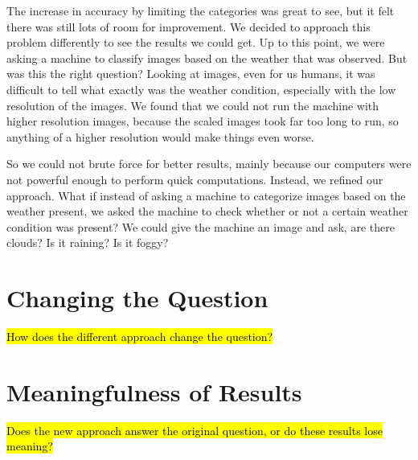 The increase in accuracy by limiting the categories was great to see, but it felt there was still lots of room for improvement. We decided to approach this problem differently to see the results we could get. Up to this point, we were asking a machine to classify images based on the weather that was observed. But was this the right question? Looking at images, even for us humans, it was difficult to tell what exactly was the weather condition, especially with the low resolution of the images. We found that we could not run the machine with higher resolution images, because the scaled images took far too long to run, so anything of a higher resolution would make things even worse.

So we could not brute force for better results, mainly because our computers were not powerful enough to perform quick computations. Instead, we refined our approach. What if instead of asking a machine to categorize images based on the weather present, we asked the machine to check whether or not a certain weather condition was present? We could give the machine an image and ask, are there clouds? Is it raining? Is it foggy?

\section{Changing the Question}

\hl{How does the different approach change the question?}

\section{Meaningfulness of Results}

\hl{Does the new approach answer the original question, or do these results lose meaning?}

